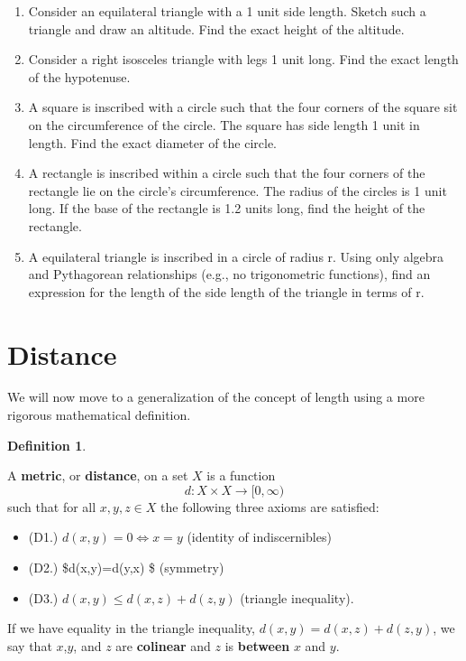 \documentclass[
]{book}
\providecommand{\tightlist}{%
  \setlength{\itemsep}{0pt}\setlength{\parskip}{0pt}}
\theoremstyle{definition}
\newtheorem{definition}{Definition}[chapter]
\theoremstyle{definition}
\theoremstyle{definition}
\theoremstyle{definition}
\theoremstyle{remark}
\begin{document}
\begin{enumerate}
\def\labelenumi{\arabic{enumi}.}
\item
  Consider an equilateral triangle with a 1 unit side length. Sketch such a triangle and draw an altitude. Find the exact height of the altitude.
\item
  Consider a right isosceles triangle with legs 1 unit long. Find the exact length of the hypotenuse.
\item
  A square is inscribed with a circle such that the four corners of the square sit on the circumference of the circle. The square has side length 1 unit in length. Find the exact diameter of the circle.
\item
  A rectangle is inscribed within a circle such that the four corners of the rectangle lie on the circle's circumference. The radius of the circles is 1 unit long. If the base of the rectangle is 1.2 units long, find the height of the rectangle.
\item
  A equilateral triangle is inscribed in a circle of radius r. Using only algebra and Pythagorean relationships (e.g., no trigonometric functions), find an expression for the length of the side length of the triangle in terms of r.
\end{enumerate}

\hypertarget{distance}{%
\section{Distance}\label{distance}}

We will now move to a generalization of the concept of length using a more rigorous mathematical definition.

\begin{definition}
\protect\hypertarget{def:unlabeled-div-211}{}\label{def:unlabeled-div-211}

A \textbf{metric}, or \textbf{distance}, on a set \(X\) is a function
\[d: X\times X \rightarrow [0,\infty)\] such that for all \(x,y,z\in X\) the following three axioms are satisfied:

\begin{itemize}
\tightlist
\item
  (D1.) \(d(x,y)=0 \Leftrightarrow x=y\) (identity of indiscernibles)
\item
  (D2.) \$d(x,y)=d(y,x) \$ (symmetry)
\item
  (D3.) \(d(x,y) \leq d(x,z)+d(z,y)\) (triangle inequality).
\end{itemize}

If we have equality in the triangle inequality, \(d(x,y)=d(x,z)+d(z,y)\), we say that \(x\),\(y\), and \(z\) are \textbf{colinear} and \(z\) is \textbf{between} \(x\) and \(y\).

\end{definition}
\end{document}
